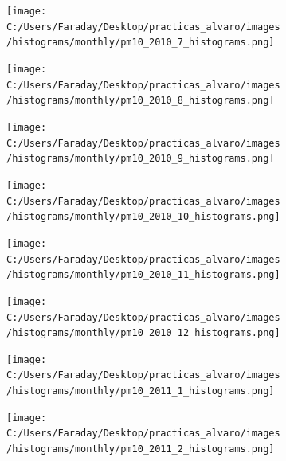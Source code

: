 \documentclass[12pt]{article}
\begin{document}
\newpage

\begin{figure}[H]
\centering
\begin{subfigure}[h]{0.45\textwidth}
\texttt{[image: C:/Users/Faraday/Desktop/practicas\_alvaro/images/histograms/monthly/pm10\_2010\_7\_histograms.png]}
\caption{}
\label{fig:hist-mon-3-7-2010}
\end{subfigure}
%
\begin{subfigure}[H]{0.45\textwidth}
\texttt{[image: C:/Users/Faraday/Desktop/practicas\_alvaro/images/histograms/monthly/pm10\_2010\_8\_histograms.png]}
\caption{}
\label{fig:hist-mon-3-8-2010}
\end{subfigure}
\caption{}
\end{figure}

\begin{figure}[H]
\centering
\begin{subfigure}[h]{0.45\textwidth}
\texttt{[image: C:/Users/Faraday/Desktop/practicas\_alvaro/images/histograms/monthly/pm10\_2010\_9\_histograms.png]}
\caption{}
\label{fig:hist-mon-3-9-2010}
\end{subfigure}
%
\begin{subfigure}[H]{0.45\textwidth}
\texttt{[image: C:/Users/Faraday/Desktop/practicas\_alvaro/images/histograms/monthly/pm10\_2010\_10\_histograms.png]}
\caption{}
\label{fig:hist-mon-3-10-2010}
\end{subfigure}
\caption{}
\end{figure}

\begin{figure}[H]
\centering
\begin{subfigure}[h]{0.45\textwidth}
\texttt{[image: C:/Users/Faraday/Desktop/practicas\_alvaro/images/histograms/monthly/pm10\_2010\_11\_histograms.png]}
\caption{}
\label{fig:hist-mon-3-11-2010}
\end{subfigure}
%
\begin{subfigure}[H]{0.45\textwidth}
\texttt{[image: C:/Users/Faraday/Desktop/practicas\_alvaro/images/histograms/monthly/pm10\_2010\_12\_histograms.png]}
\caption{}
\label{fig:hist-mon-3-12-2010}
\end{subfigure}
\caption{}
\end{figure}

\newpage

\begin{figure}[H]
\centering
\begin{subfigure}[h]{0.45\textwidth}
\texttt{[image: C:/Users/Faraday/Desktop/practicas\_alvaro/images/histograms/monthly/pm10\_2011\_1\_histograms.png]}
\caption{}
\label{fig:hist-mon-3-1-2011}
\end{subfigure}
%
\begin{subfigure}[H]{0.45\textwidth}
\texttt{[image: C:/Users/Faraday/Desktop/practicas\_alvaro/images/histograms/monthly/pm10\_2011\_2\_histograms.png]}
\caption{}
\label{fig:hist-mon-3-2-2011}
\end{subfigure}
\caption{}
\end{figure}
\end{document}
